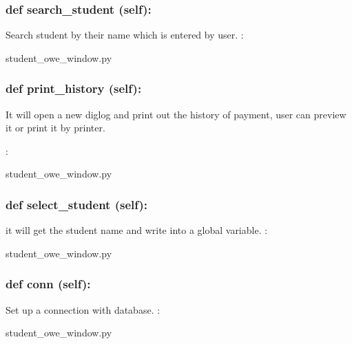 \hypertarget{class_poly_a14a7ad77ce612b0c54f531d307ee4b39}{
\subsubsection[{def search_student (self):}]{\setlength{\rightskip}{0pt plus 5cm}def {search\_student} (self):}}\label{class_poly_a14a7ad77ce612b0c54f531d307ee4b39}
Search student by their name which is entered by user. 
:\begin{DoxyCompactItemize}
\item 
student\_owe\_window.\-py\end{DoxyCompactItemize}

\hypertarget{class_poly_a14a7ad77ce612b0c54f531d307ee4b39}{
\subsubsection[{def print_history (self):}]{\setlength{\rightskip}{0pt plus 5cm}def {print\_history} (self):}}\label{class_poly_a14a7ad77ce612b0c54f531d307ee4b39}
It will open a new diglog and print out the history of payment, user can preview it or print it by printer.
 
:\begin{DoxyCompactItemize}
\item 
student\_owe\_window.\-py\end{DoxyCompactItemize}

\hypertarget{class_poly_a14a7ad77ce612b0c54f531d307ee4b39}{
\subsubsection[{def select_student (self):}]{\setlength{\rightskip}{0pt plus 5cm}def {select\_student} (self):}}\label{class_poly_a14a7ad77ce612b0c54f531d307ee4b39}
it will get the student name and write into a global variable.
:\begin{DoxyCompactItemize}
\item 
student\_owe\_window.\-py\end{DoxyCompactItemize}

\hypertarget{class_poly_a14a7ad77ce612b0c54f531d307ee4b39}{
\subsubsection[{def conn (self):}]{\setlength{\rightskip}{0pt plus 5cm}def {conn} (self):}}\label{class_poly_a14a7ad77ce612b0c54f531d307ee4b39}
Set up a connection with database.
:\begin{DoxyCompactItemize}
\item 
student\_owe\_window.\-py\end{DoxyCompactItemize}

